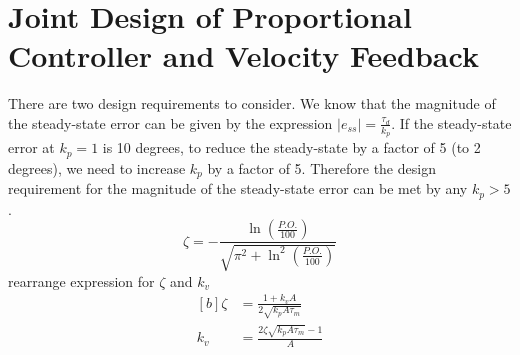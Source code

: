 \documentclass[12pt]{article}
\begin{document}

\setcounter{section}{5}
\section{Joint Design of Proportional Controller and Velocity Feedback}
There are two design requirements to consider. We know that the magnitude of the steady-state error can be given by the expression $\left| e_{ss} \right| = \frac{\tau_d}{k_p}$. If the steady-state error at $k_p = 1$ is 10 degrees, to reduce the steady-state by a factor of 5 (to 2 degrees), we need to increase $k_p$ by a factor of 5. Therefore the design requirement for the magnitude of the steady-state error can be met by any $k_p > 5$. 
\begin{equation}
    \zeta = -\frac{\ln\left(\frac{P.O.}{100}\right)}{\sqrt{\pi^2 + \ln^2\left(\frac{P.O.}{100}\right)}}
\end{equation}
rearrange expression for $\zeta$ and $k_v$
\begin{equation}
\begin{aligned}[b]
    \zeta &= \frac{1+k_vA}{2\sqrt{k_pA\tau_m}} \\
    k_v &= \frac{2\zeta\sqrt{k_pA\tau_m}-1}{A} 
\end{aligned}
\end{equation}


\end{document}
